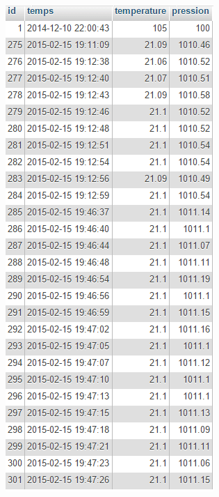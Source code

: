 \begin{figure}[!h]
	\centering
	\begin{minipage}{.5\linewidth}
		\centering
		\includegraphics[width=.8\linewidth]{Images/Donnees_BDD}
	\end{minipage}%
	\begin{minipage}{.5\linewidth}
		\centering

\end{minipage}
\end{figure}
